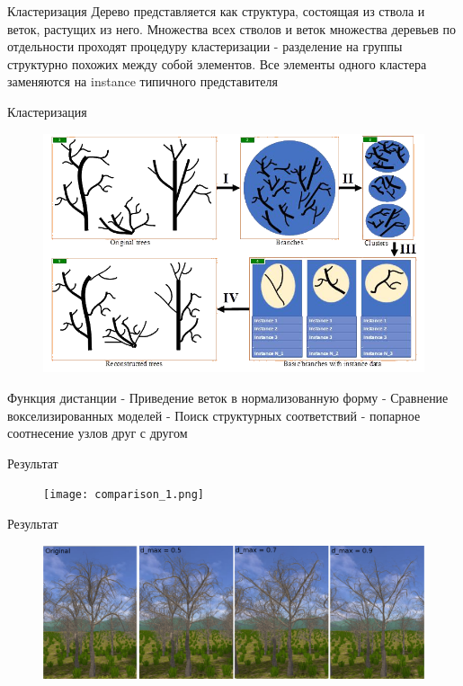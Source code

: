 \documentclass[14pt]{beamer}
\begin{document}
\begin{frame}{Кластеризация}
Дерево представляется как структура, состоящая из ствола и веток, растущих из него. \linebreak	
Множества всех стволов и веток множества деревьев по отдельности проходят процедуру кластеризации - разделение на группы структурно похожих между собой элементов.\linebreak	
Все элементы одного кластера заменяются на instance типичного представителя\linebreak	
\end{frame}
\begin{frame}{Кластеризация}
\begin{figure}[hbtp]
\includegraphics[scale=0.56]{Clustering.png}
\end{figure}
\end{frame}
\begin{frame}{Функция дистанции}
 - Приведение веток в нормализованную форму\linebreak	
 - Сравнение вокселизированных моделей \linebreak	
 - Поиск структурных соответствий - попарное соотнесение узлов друг с другом

\end{frame}
\begin{frame}{Результат}
\begin{figure}[hbtp]
\texttt{[image: comparison\_1.png]}
\end{figure}
\end{frame}
\begin{frame}{Результат}
\begin{figure}[hbtp]
\includegraphics[scale=0.15]{comparison_2.png}
\end{figure}
\end{frame}
\end{document}
